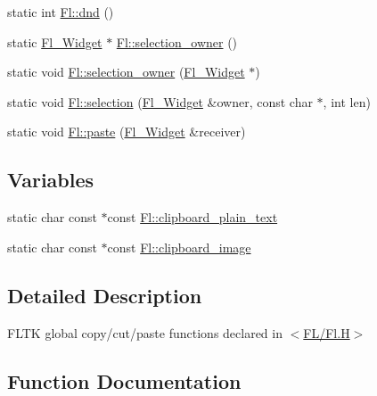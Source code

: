 \begin{DoxyCompactItemize}
static int \hyperlink{group__fl__clipboard_gae5dcb9b03a8c090e76517d8f5bc586d8}{Fl\+::dnd} ()
\item 
static \hyperlink{class_fl___widget}{Fl\+\_\+\+Widget} $\ast$ \hyperlink{group__fl__clipboard_gab237801bd5deece817c5001e9a72fdef}{Fl\+::selection\+\_\+owner} ()
\item 
static void \hyperlink{group__fl__clipboard_gaabef2df6ce614f8fc28fed4063fbca3c}{Fl\+::selection\+\_\+owner} (\hyperlink{class_fl___widget}{Fl\+\_\+\+Widget} $\ast$)
\item 
static void \hyperlink{group__fl__clipboard_ga07c2e739485a127cdf10b5a9669b333d}{Fl\+::selection} (\hyperlink{class_fl___widget}{Fl\+\_\+\+Widget} \&owner, const char $\ast$, int len)
\item 
static void \hyperlink{group__fl__clipboard_ga941286738083a632b155a132a3a28716}{Fl\+::paste} (\hyperlink{class_fl___widget}{Fl\+\_\+\+Widget} \&receiver)
\end{DoxyCompactItemize}
\subsection*{Variables}
\begin{DoxyCompactItemize}
\item 
static char const  $\ast$const \hyperlink{group__fl__clipboard_gae43ed653c1d222930510ad8042b55536}{Fl\+::clipboard\+\_\+plain\+\_\+text}
\item 
static char const  $\ast$const \hyperlink{group__fl__clipboard_gae37fa003534c8cc9a84b66a7040ddfcb}{Fl\+::clipboard\+\_\+image}
\end{DoxyCompactItemize}


\subsection{Detailed Description}
F\+L\+TK global copy/cut/paste functions declared in $<$\hyperlink{_fl_8_h}{F\+L/\+Fl.\+H}$>$ 

\subsection{Function Documentation}
\mbox{\label{group__fl__clipboard_gacb12c3b9a4f45f9ba9b7d8689c42d07c}} 

